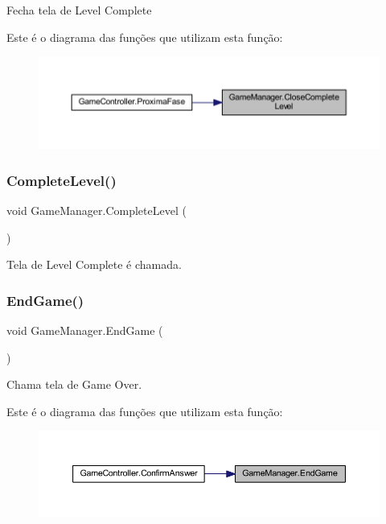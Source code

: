 Fecha tela de \textquotesingle{}Level Complete\textquotesingle{} 

Este é o diagrama das funções que utilizam esta função\+:
\nopagebreak
\begin{figure}[H]
\begin{center}
\leavevmode
\includegraphics[width=350pt]{class_game_manager_ae7ca31f79eef5dfa0dd3ebac36cfdc39_icgraph}
\end{center}
\end{figure}
\mbox{\label{class_game_manager_a37926cd1481f41fd1665abb4f08ea547}} 
\subsubsection{CompleteLevel()}
{\footnotesize\ttfamily void Game\+Manager.\+Complete\+Level (\begin{DoxyParamCaption}{ }\end{DoxyParamCaption})}



Tela de \textquotesingle{}Level Complete\textquotesingle{} é chamada. 

\mbox{\label{class_game_manager_a0c10b4d89c6e37a4433a54a5b7b04500}} 
\subsubsection{EndGame()}
{\footnotesize\ttfamily void Game\+Manager.\+End\+Game (\begin{DoxyParamCaption}{ }\end{DoxyParamCaption})}



Chama tela de \textquotesingle{}Game Over\textquotesingle{}. 

Este é o diagrama das funções que utilizam esta função\+:
\nopagebreak
\begin{figure}[H]
\begin{center}
\leavevmode
\includegraphics[width=350pt]{class_game_manager_a0c10b4d89c6e37a4433a54a5b7b04500_icgraph}
\end{center}
\end{figure}
\mbox{\label{class_game_manager_aa5c30fd232656ad8bfe61cf9d6f65860}} 
